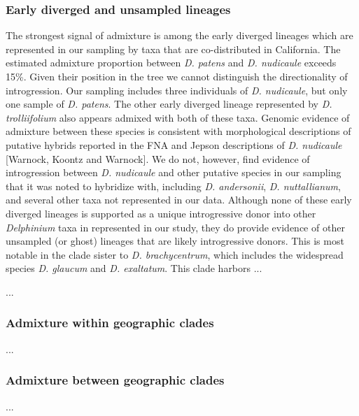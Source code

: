 \documentclass[11pt]{article}
\begin{document}
\subsubsection{Early diverged and unsampled lineages}
The strongest signal of admixture is among the early diverged lineages which are 
represented in our sampling by taxa that are co-distributed in California.
The estimated admixture proportion between \emph{D. patens} and \emph{D. nudicaule} 
exceeds 15\%. 
Given their position in the tree we cannot distinguish the directionality 
of introgression. Our sampling includes three individuals of \emph{D. nudicaule}, but
only one sample of \emph{D. patens}. 
% 
The other early diverged lineage represented by \emph{D. trolliifolium} also appears
admixed with both of these taxa.
Genomic evidence of admixture between these species is consistent with morphological
descriptions of putative hybrids reported in the FNA and Jepson descriptions 
of \emph{D. nudicaule} [Warnock, Koontz and Warnock]. We do not, however, find evidence
of introgression between \emph{D. nudicaule} and other putative species in our sampling 
that it was noted to hybridize with, including \emph{D. andersonii}, \emph{D. nuttallianum}, 
and several other taxa not represented in our data.
% 
Although none of these early diverged lineages is supported as a unique introgressive
donor into other \emph{Delphinium} taxa in represented in our study, they do provide
evidence of other unsampled (or ghost) lineages that are likely introgressive donors.
This is most notable in the clade sister to \emph{D. brachycentrum}, which includes 
the widespread species \emph{D. glaucum} and \emph{D. exaltatum}. 
This clade harbors ...
% 

...


\subsubsection{Admixture within geographic clades}
...


\subsubsection{Admixture between geographic clades}
...
\end{document}
